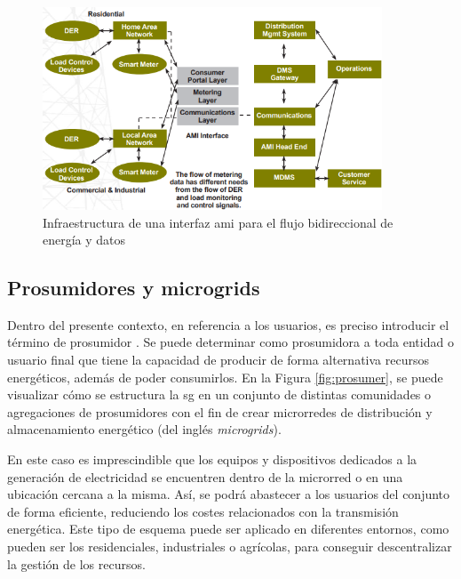 \vspace{3mm}

\begin{figure}[H]
  \centering
  \includegraphics[width=0.9\textwidth]{img/teoria/bidir.png}
  \caption{Infraestructura de una interfaz \acrshort{ami} para el flujo bidireccional de energía y datos \cite{us}}
  \label{fig:bidireccional2}
\end{figure}


\subsection{Prosumidores y microgrids}
\label{sec:prosu}

Dentro del presente contexto, en referencia a los usuarios, es preciso introducir el término de prosumidor \cite{transactive}. Se puede determinar como prosumidora a toda entidad o usuario final que tiene la capacidad de producir de forma alternativa recursos energéticos, además de poder consumirlos. En la Figura \ref{fig:prosumer}, se puede visualizar cómo se estructura la \gls{sg} en un conjunto de distintas comunidades o agregaciones de prosumidores con el fin de crear microrredes de distribución y almacenamiento energético (del inglés \textit{microgrids}).

\vspace{3mm}

En este caso es imprescindible que los equipos y dispositivos dedicados a la generación de electricidad se encuentren dentro de la microrred o en una ubicación cercana a la misma. Así, se podrá abastecer a los usuarios del conjunto de forma eficiente, reduciendo los costes relacionados con la transmisión energética. Este tipo de esquema puede ser aplicado en diferentes entornos, como pueden ser los residenciales, industriales o agrícolas, para conseguir descentralizar la gestión de los recursos. 

